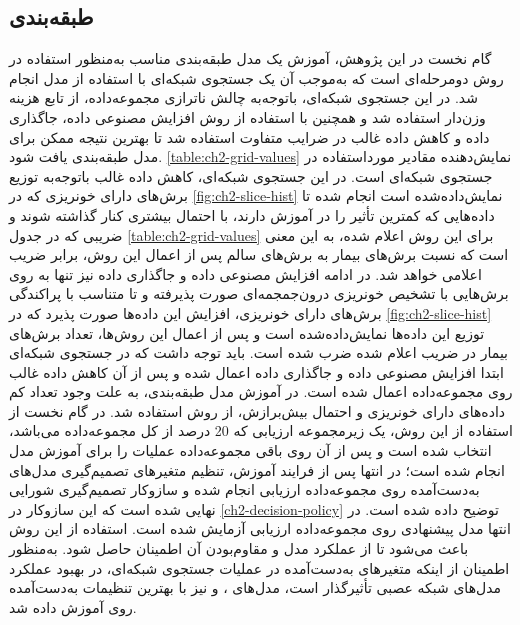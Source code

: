 \subsection{طبقه‌بندی}

گام نخست در این پژوهش، آموزش یک مدل طبقه‌بندی مناسب به‌منظور استفاده در روش دومرحله‌ای است که به‌موجب آن یک جستجوی شبکه‌ای 
با استفاده از مدل 
انجام شد. در این جستجوی شبکه‌ای،‌ باتوجه‌به چالش‌ ناترازی مجموعه‌داده، از تابع هزینه 
وزن‌دار استفاده شد و همچنین با استفاده از روش افزایش مصنوعی داده، جاگذاری داده
و کاهش داده غالب در ضرایب متفاوت استفاده شد تا بهترین نتیجه ممکن برای مدل طبقه‌بندی یافت شود. 
\autoref{table:ch2-grid-values}
نمایش‌دهنده مقادیر مورداستفاده در جستجوی شبکه‌ای است. در این جستجوی شبکه‌ای، کاهش داده غالب باتوجه‌به توزیع برش‌های دارای خونریزی که در 
\autoref{fig:ch2-slice-hist}
نمایش‌داده‌شده است انجام شده تا داده‌هایی که کمترین تأثیر  را در آموزش دارند،‌ با احتمال بیشتری کنار گذاشته شوند و ضریبی که در جدول 
\autoref{table:ch2-grid-values}
برای این روش اعلام شده،‌ به این معنی است که نسبت برش‌های بیمار به برش‌های سالم پس از اعمال این روش، برابر ضریب اعلامی خواهد شد.
در ادامه افزایش مصنوعی داده و جاگذاری داده نیز‌ تنها به روی برش‌هایی با تشخیص خونریزی درون‌جمجمه‌ای صورت پذیرفته و تا متناسب  با پراکندگی برش‌های دارای خونریزی، افزایش این داده‌ها صورت پذیرد که در 
\autoref{fig:ch2-slice-hist}
توزیع این داده‌ها نمایش‌داده‌شده است و پس از اعمال این روش‌ها، تعداد برش‌های بیمار در ضریب اعلام شده ضرب شده است. باید توجه داشت که در جستجوی شبکه‌ای ابتدا  افزایش مصنوعی داده و جاگذاری داده اعمال شده و پس از آن کاهش داده غالب روی مجموعه‌داده اعمال شده است.
در آموزش مدل طبقه‌بندی، به علت وجود تعداد کم داده‌های دارای خونریزی و احتمال بیش‌برازش،
از روش 
استفاده شد. در گام نخست از استفاده از این روش، یک زیرمجموعه ارزیابی
که 20 درصد از کل مجموعه‌داده می‌باشد، انتخاب شده ‌است و پس از آن روی باقی مجموعه‌داده عملیات
را برای آموزش مدل انجام شده است؛ در انتها پس از فرایند آموزش، تنظیم متغیرهای تصمیم‌گیری‌ مدل‌های به‌دست‌آمده روی مجموعه‌داده ارزیابی انجام شده و سازوکار تصمیم‌گیری شورایی
نهایی شده است که این سازوکار در 
\autoref{ch2-decision-policy}
توضیح داده شده است.
در انتها مدل پیشنهادی روی مجموعه‌داده ارزیابی آزمایش شده است. استفاده از این روش باعث می‌شود تا از عملکرد مدل و مقاوم‌بودن آن اطمینان حاصل شود. به‌منظور اطمینان از اینکه متغیرهای به‌دست‌آمده در عملیات جستجوی شبکه‌ای،‌ در بهبود عملکرد مدل‌های شبکه عصبی تأثیرگذار است، مدل‌های 
، و 
نیز با بهترین تنظیمات به‌دست‌آمده روی 
آموزش داده شد.

